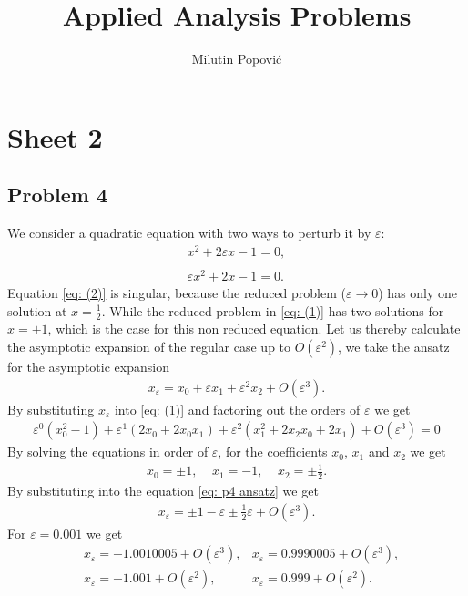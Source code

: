 \documentclass[a4paper]{article}
\title{Applied Analysis Problems}
\author{Milutin Popović}
\newcommand{\eps}{\varepsilon}
\begin{document}
\maketitle
\tableofcontents

\section{Sheet 2}
\subsection{Problem 4}
We consider a quadratic equation with two ways to perturb it by $\eps$:
\begin{align}
    x^2 + 2\eps x -1 = 0, \label{eq: (1)}\\
    \nonumber \\
    \eps x^2 + 2x - 1 = 0.\label{eq: (2)}
\end{align}
Equation \ref{eq: (2)} is singular, because the reduced problem ($\eps
\rightarrow 0$) has only one solution at $x = \frac{1}{2}$. While the reduced
problem in \ref{eq: (1)} has two solutions for $x = \pm 1$, which is the case
for this non reduced equation. Let us thereby calculate the asymptotic
expansion of the regular case up to $O(\eps^2)$, we take the ansatz for the
asymptotic expansion
\begin{align}\label{eq: p4 ansatz}
    x_\eps = x_0 + \eps x_1 + \eps^2 x_2 + O(\eps^3).
\end{align}
By substituting $x_\eps$ into \ref{eq: (1)} and factoring out the orders of
$\eps$ we get
\begin{align}
    \eps^0 (x_0^2 - 1) + \eps^1(2x_0 + 2x_0x_1) + \eps^2(x_1^2+2x_2x_0
    +2x_1) + O(\eps^3) = 0
\end{align}
By solving the equations in order of $\eps$, for the coefficients
$x_0$, $x_1$ and $x_2$ we get
\begin{align}
    x_0 = \pm 1, \;\;\;\; x_1 = -1, \;\;\;\; x_2 = \pm \frac{1}{2}.
\end{align}
By substituting into the equation \ref{eq: p4 ansatz} we get
\begin{align}
    x_\eps = \pm 1 - \eps \pm \frac{1}{2} \eps + O(\eps^3).
\end{align}
For $\eps = 0.001$ we get
\begin{align}
    &x_\eps = -1.0010005 + O(\eps^3),  &x_\eps = 0.9990005 + O(\eps^3),\\
    &x_\eps = -1.001 + O(\eps^2),      &x_\eps = 0.999 + O(\eps^2).
\end{align}
\end{document}
